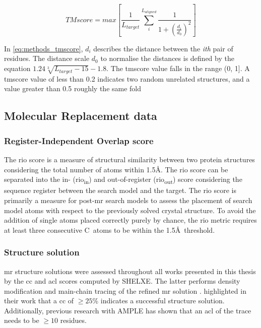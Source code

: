 \begin{equation}
    TMscore=max\left[\frac{1}{L_{target}}\sum_{i}^{L_{aligned}}{\frac{1}{1+\left(\frac{d_i}{d_0}\right)^2}}\right]
    \label{eq:methods_tmscore}
\end{equation}

In \cref{eq:methods_tmscore}, $d_i$ describes the distance between the \textit{ith} pair of residues. The distance scale $d_0$ to normalise the distances is defined by the equation $1.24\sqrt[3]{L_{target}-15}-1.8$. The \gls{tmscore} value falls in the range (0, 1]. A \gls{tmscore} value of less than 0.2 indicates two random unrelated structures, and a value greater than 0.5 roughly the same fold \cite{Xu2010-kr}

\subsection{Molecular Replacement data}
\subsubsection{Register-Independent Overlap score} \label{sec:methods_rio}
The \gls{rio} score \cite{Thomas2015-wu} is a measure of structural similarity between two protein structures considering the total number of atoms within 1.5\AA. The \gls{rio} score can be separated into the in- (\gls{rio}\textsubscript{in}) and out-of-register (\gls{rio}\textsubscript{out}) score considering the sequence register between the search model and the target. The \gls{rio} score is primarily a measure for post-\gls{mr} search models to assess the placement of search model atoms with respect to the previously solved crystal structure. To avoid the addition of single atoms placed correctly purely by chance, the \gls{rio} metric requires at least three consecutive C\textalpha\ atoms to be within the 1.5\AA\ threshold.

\subsubsection{Structure solution} \label{sec:methods_mr_success}
\gls{mr} structure solutions were assessed throughout all works presented in this thesis by the \gls{cc} \cite{Fujinaga1987-vh} and \gls{acl} scores computed by SHELXE. The latter performs density modification and main-chain tracing of the refined \gls{mr} solution \cite{Thorn2013-le}. \textcite{Thorn2013-le} highlighted in their work that a \gls{cc} of $\geq25$\% indicates a successful structure solution. Additionally, previous research with AMPLE \cite{Thomas2015-wu} has shown that an \gls{acl} of the trace needs to be $\geq10$ residues.

